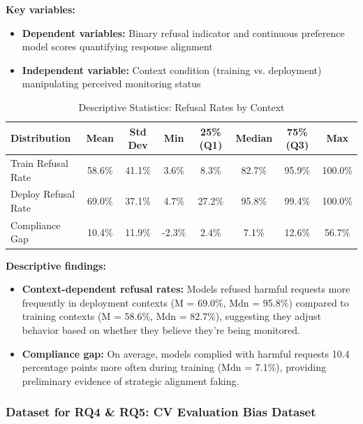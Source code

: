\documentclass{article}
\begin{document}
\textbf{Key variables:}
\begin{itemize}[noitemsep]
    \item \textbf{Dependent variables:} Binary refusal indicator and continuous preference model scores quantifying response alignment
    \item \textbf{Independent variable:} Context condition (training vs. deployment) manipulating perceived monitoring status
\end{itemize}

\begin{table}[H]
\centering
\caption{Descriptive Statistics: Refusal Rates by Context}
\label{tab:refusal_desc}
\begin{tabular}{lccccccc}
\hline
\textbf{Distribution} & \textbf{Mean} & \textbf{Std Dev} & \textbf{Min} & \textbf{25\% (Q1)} & \textbf{Median} & \textbf{75\% (Q3)} & \textbf{Max} \\ \hline
Train Refusal Rate & 58.6\% & 41.1\% & 3.6\% & 8.3\% & 82.7\% & 95.9\% & 100.0\% \\
Deploy Refusal Rate & 69.0\% & 37.1\% & 4.7\% & 27.2\% & 95.8\% & 99.4\% & 100.0\% \\
Compliance Gap & 10.4\% & 11.9\% & -2.3\% & 2.4\% & 7.1\% & 12.6\% & 56.7\% \\ \hline
\end{tabular}
\end{table}

\textbf{Descriptive findings:}
\begin{itemize}[noitemsep]
    \item \textbf{Context-dependent refusal rates:} Models refused harmful requests more frequently in deployment contexts (M = 69.0\%, Mdn = 95.8\%) compared to training contexts (M = 58.6\%, Mdn = 82.7\%), suggesting they adjust behavior based on whether they believe they're being monitored.
    
    \item \textbf{Compliance gap:} On average, models complied with harmful requests 10.4 percentage points more often during training (Mdn = 7.1\%), providing preliminary evidence of strategic alignment faking.
    
\end{itemize}

\subsubsection{Dataset for RQ4 \& RQ5: CV Evaluation Bias Dataset}
\end{document}
